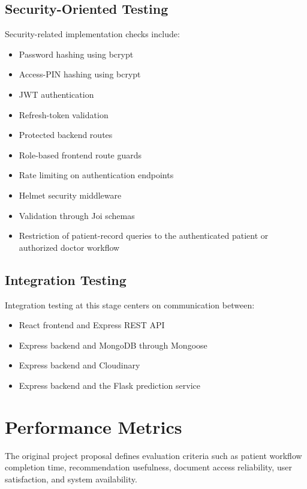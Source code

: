 \documentclass{tietreport}
\begin{document}
\subsection{Security-Oriented Testing}

Security-related implementation checks include:

\begin{itemize}
  \item Password hashing using bcrypt
  \item Access-PIN hashing using bcrypt
  \item JWT authentication
  \item Refresh-token validation
  \item Protected backend routes
  \item Role-based frontend route guards
  \item Rate limiting on authentication endpoints
  \item Helmet security middleware
  \item Validation through Joi schemas
  \item Restriction of patient-record queries to the authenticated
    patient or authorized doctor workflow
\end{itemize}

\subsection{Integration Testing}

Integration testing at this stage centers on communication between:

\begin{itemize}
  \item React frontend and Express REST API
  \item Express backend and MongoDB through Mongoose
  \item Express backend and Cloudinary
  \item Express backend and the Flask prediction service
\end{itemize}

\section{Performance Metrics}

The original project proposal defines evaluation criteria such as
patient workflow completion time, recommendation usefulness, document
access reliability, user satisfaction, and system availability.
\end{document}
